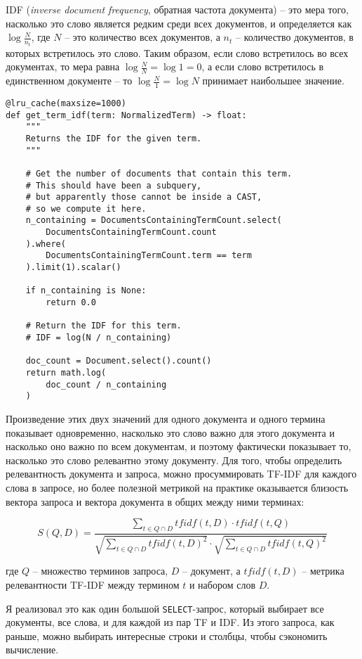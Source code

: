 \documentclass[a4page]{article}
\begin{document}
IDF (\textit{inverse document frequency}, обратная частота документа) -- это мера того, насколько это слово является редким среди всех документов, и определяется как $\log \frac{N}{n_t}$, где $N$ -- это количество всех документов, а $n_t$ -- количество документов, в которых встретилось это слово. Таким образом, если слово встретилось во всех документах, то мера равна $\log \frac{N}{N} = \log 1 = 0$, а если слово встретилось в единственном документе -- то $\log \frac{N}{1} = \log N$ принимает наибольшее значение.

\begin{verbatim}
@lru_cache(maxsize=1000)
def get_term_idf(term: NormalizedTerm) -> float:
    """
    Returns the IDF for the given term.
    """

    # Get the number of documents that contain this term.
    # This should have been a subquery,
    # but apparently those cannot be inside a CAST,
    # so we compute it here.
    n_containing = DocumentsContainingTermCount.select(
        DocumentsContainingTermCount.count
    ).where(
        DocumentsContainingTermCount.term == term
    ).limit(1).scalar()

    if n_containing is None:
        return 0.0

    # Return the IDF for this term.
    # IDF = log(N / n_containing)

    doc_count = Document.select().count()
    return math.log(
        doc_count / n_containing
    )
\end{verbatim}

Произведение этих двух значений для одного документа и одного термина показывает одновременно, насколько это слово важно для этого документа и насколько оно важно по всем документам, и поэтому фактически показывает то, насколько это слово релевантно этому документу. Для того, чтобы определить релевантность документа и запроса, можно просуммировать TF-IDF для каждого слова в запросе, но более полезной метрикой на практике оказывается близость вектора запроса и вектора документа в общих между ними терминах:

$$ S(Q, D) = \frac{\sum_{t \in Q \cap D} tfidf(t, D) \cdot tfidf(t, Q)}{\sqrt{\sum_{t \in Q \cap D} tfidf(t, D)^2} \cdot \sqrt{\sum_{t \in Q \cap D} tfidf(t, Q)^2}}$$

где $Q$ -- множество терминов запроса, $D$ -- документ, а $tfidf(t, D)$ -- метрика релевантности TF-IDF между термином $t$ и набором слов $D$.

Я реализовал это как один большой \texttt{SELECT}-запрос, который выбирает все документы, все слова, и для каждой из пар TF и IDF. Из этого запроса, как раньше, можно выбирать интересные строки и столбцы, чтобы сэкономить вычисление.
\end{document}
